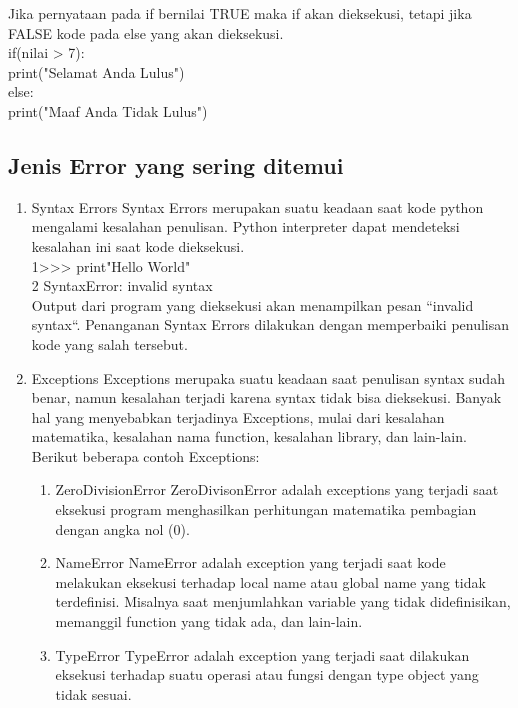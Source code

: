 Jika pernyataan pada if bernilai TRUE maka if akan dieksekusi, tetapi jika FALSE kode pada else yang akan dieksekusi.\\
if(nilai > 7):\\
    print("Selamat Anda Lulus")\\
else:\\
    print("Maaf Anda Tidak Lulus")

\subsection{Jenis Error yang sering ditemui}
\begin{enumerate}
\item
Syntax Errors
Syntax Errors merupakan suatu keadaan saat kode python mengalami kesalahan penulisan. Python interpreter dapat mendeteksi kesalahan ini saat kode dieksekusi.\\
1>>> print"Hello World"\\
2	SyntaxError: invalid syntax\\

Output dari program yang dieksekusi akan menampilkan pesan “invalid syntax“. Penanganan Syntax Errors dilakukan dengan memperbaiki penulisan kode yang salah tersebut. 

\item
Exceptions
Exceptions merupaka suatu keadaan saat penulisan syntax sudah benar, namun kesalahan terjadi karena syntax tidak bisa dieksekusi. Banyak hal yang menyebabkan terjadinya Exceptions, mulai dari kesalahan matematika, kesalahan nama function, kesalahan library, dan lain-lain.\\

Berikut beberapa contoh Exceptions:
\begin{enumerate}
\item
ZeroDivisionError
ZeroDivisonError adalah exceptions yang terjadi saat eksekusi program menghasilkan perhitungan matematika pembagian dengan angka nol (0).
\item
NameError
NameError adalah exception yang terjadi saat kode melakukan eksekusi terhadap local name atau global name yang tidak terdefinisi. Misalnya saat menjumlahkan variable yang tidak didefinisikan, memanggil function yang tidak ada, dan lain-lain.
\item
TypeError
TypeError adalah exception yang terjadi saat dilakukan eksekusi terhadap suatu operasi atau fungsi dengan type object yang tidak sesuai.


\end{enumerate}

\end{enumerate}
